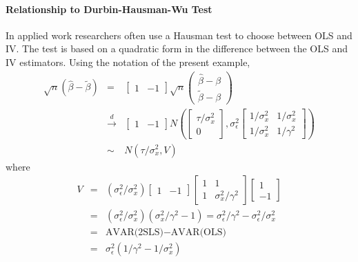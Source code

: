 \documentclass[12pt]{article}
\theoremstyle{definition}
\begin{document}
\paragraph{Relationship to Durbin-Hausman-Wu Test} In applied work researchers often use a Hausman test to choose between OLS and IV. The test is based on a quadratic form in the difference between the OLS and IV estimators. Using the notation of the present example, 
  \begin{eqnarray*}
    \sqrt{n}\left(\widehat{\beta} - \widetilde{\beta}\right) &=&\left[\begin{array}{cc}
    1 & -1
    \end{array}\right] \sqrt{n} \left(\begin{array}{c}
    \widehat{\beta} - \beta  \\ \widetilde{\beta} - \beta
    \end{array} \right)\\
     &\overset{d}{\rightarrow}& \left[\begin{array}{cc}
    1 & -1
    \end{array}\right]
    N\left(\left[
      \begin{array}{c}
        \tau/\sigma_x^2 \\ 0
      \end{array}\right],\sigma_\epsilon^2\left[
        \begin{array}{cc}
          1/\sigma_x^2 & 1/\sigma_x^2 \\
          1/\sigma_x^2 & 1/\gamma^2
        \end{array}
      \right]
    \right)\\
    &\sim& N\left(\tau/\sigma_x^2, V
    \right)
  \end{eqnarray*}
where
    \begin{eqnarray*}
      V &=& (\sigma_\epsilon^2/\sigma_x^2) \left[\begin{array}{cc}
    1 & -1
    \end{array}\right]
      \left[
        \begin{array}{cc}
          1&1\\
          1&\sigma_x^2/\gamma^2
        \end{array}
      \right]
    \left[\begin{array}{c}
    1 \\ -1
    \end{array}\right]\\
        &=& (\sigma_\epsilon^2/\sigma_x^2)(\sigma_x^2/\gamma^2 - 1) = \sigma_\epsilon^2/\gamma^2 - \sigma_\epsilon^2/\sigma_x^2 \\
        &=& \mbox{AVAR(2SLS)} - \mbox{AVAR(OLS)}\\
        &=& \sigma_\epsilon^2 \left(1/\gamma^2 - 1/\sigma_x^2 \right)
    \end{eqnarray*}
\end{document}
